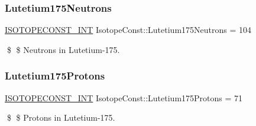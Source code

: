 \subsubsection{\texorpdfstring{Lutetium175\+Neutrons}{Lutetium175Neutrons}}
{\footnotesize\ttfamily \mbox{\hyperlink{group___isotope_const-_macros_ga5f18360b3e99483a35c32d789e62621c}{I\+S\+O\+T\+O\+P\+E\+C\+O\+N\+S\+T\+\_\+\+I\+NT}} Isotope\+Const\+::\+Lutetium175\+Neutrons = 104}

\$ \$ Neutrons in Lutetium-\/175. \mbox{\label{group___isotope_const-_lutetium-_lu175_ga2897a010304ca70bb0c37d1bfe7eae28}} 
\subsubsection{\texorpdfstring{Lutetium175\+Protons}{Lutetium175Protons}}
{\footnotesize\ttfamily \mbox{\hyperlink{group___isotope_const-_macros_ga5f18360b3e99483a35c32d789e62621c}{I\+S\+O\+T\+O\+P\+E\+C\+O\+N\+S\+T\+\_\+\+I\+NT}} Isotope\+Const\+::\+Lutetium175\+Protons = 71}

\$ \$ Protons in Lutetium-\/175. 